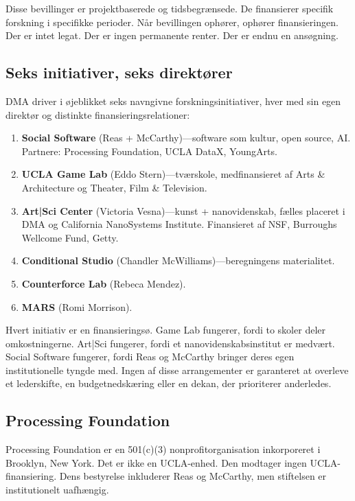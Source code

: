 \documentclass[10pt,letterpaper,twocolumn]{article}
\newcommand{\dma}{\textsc{DMA}}
\begin{document}
Disse bevillinger er projektbaserede og tidsbegrænsede. De finansierer specifik forskning i specifikke perioder. Når bevillingen ophører, ophører finansieringen. Der er intet legat. Der er ingen permanente renter. Der er endnu en ansøgning.

\subsection{Seks initiativer, seks direktører}

\dma{} driver i øjeblikket seks navngivne forskningsinitiativer, hver med sin egen direktør og distinkte finansieringsrelationer:

\begin{enumerate}
  \item \textbf{Social Software} (Reas + McCarthy)---software som kultur, open source, AI. Partnere: Processing Foundation, UCLA DataX, YoungArts.
  \item \textbf{UCLA Game Lab} (Eddo Stern)---tværskole, medfinansieret af Arts \& Architecture og Theater, Film \& Television.
  \item \textbf{Art|Sci Center} (Victoria Vesna)---kunst + nanovidenskab, fælles placeret i \dma{} og California NanoSystems Institute. Finansieret af NSF, Burroughs Wellcome Fund, Getty.
  \item \textbf{Conditional Studio} (Chandler McWilliams)---beregningens materialitet.
  \item \textbf{Counterforce Lab} (Rebeca Mendez).
  \item \textbf{MARS} (Romi Morrison).
\end{enumerate}

Hvert initiativ er en finansieringsø. Game Lab fungerer, fordi to skoler deler omkostningerne. Art|Sci fungerer, fordi et nanovidenskabsinstitut er medvært. Social Software fungerer, fordi Reas og McCarthy bringer deres egen institutionelle tyngde med. Ingen af disse arrangementer er garanteret at overleve et lederskifte, en budgetnedskæring eller en dekan, der prioriterer anderledes.

\subsection{Processing Foundation}

Processing Foundation er en 501(c)(3) nonprofitorganisation inkorporeret i Brooklyn, New York. Det er ikke en UCLA-enhed. Den modtager ingen UCLA-finansiering. Dens bestyrelse inkluderer Reas og McCarthy, men stiftelsen er institutionelt uafhængig.
\end{document}
